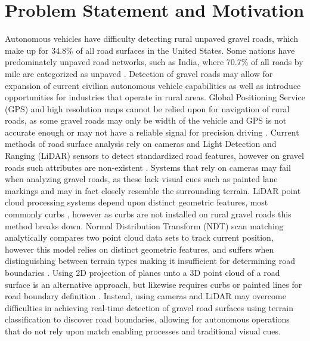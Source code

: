 \documentclass[numbered,pdftex]{ohio-etd}
\begin{document}
\section{Problem Statement and Motivation}
{
	
	{Autonomous vehicles have difficulty detecting rural unpaved gravel roads, which make up for 34.8\% \cite{road_stats_2} of all road surfaces in the United States. Some nations have predominately unpaved road networks, such as India, where 70.7\% of all roads by mile are categorized as unpaved \cite{malik_lal_2019}. Detection of gravel roads may allow for expansion of current civilian autonomous vehicle capabilities as well as introduce opportunities for industries that operate in rural areas. Global Positioning Service (GPS) and high resolution maps cannot be relied upon for navigation of rural roads, as some gravel roads may only be width of the vehicle and GPS is not accurate enough or may not have a reliable signal for precision driving \cite{noauthor_gpsgov_nodate}. Current methods of road surface analysis rely on cameras and Light Detection and Ranging (LiDAR) sensors to detect standardized road features, however on gravel roads such attributes are non-existent \cite{skorseth_gravel_nodate}. Systems that rely on cameras may fail when analyzing gravel roads, as these lack visual cues such as painted lane markings \cite{crisman_scarf_1993} and may in fact closely resemble the surrounding terrain. LiDAR point cloud processing systems depend upon distinct geometric features, most commonly curbs \cite{yadav_extraction_2017,liu_new_2013,qiu_fast_2016,fernandes_road_2014,seker_experiments_nodate,yang_semi-automated_2013,miyazaki_line-based_2014,hervieu_road_2013,smadja_road_nodate}, however as curbs are not installed on rural gravel roads \cite{skorseth_gravel_nodate} this method breaks down. Normal Distribution Transform (NDT) scan matching analytically compares two point cloud data sets to track current position, however this model relies on distinct geometric features, and suffers when distinguishing between terrain types making it insufficient for determining road boundaries \cite{biber_normal_2003}. Using 2D projection of planes unto a 3D point cloud of a road surface is an alternative approach, but likewise requires curbs or painted lines for road boundary definition \cite{fernandes_road_2014, borkar_robust_2009-1, guo_lane_2015}. Instead, using cameras and LiDAR may overcome difficulties in achieving real-time detection of gravel road surfaces using terrain classification to discover road boundaries, allowing for autonomous operations that do not rely upon match enabling processes and traditional visual cues. }
	
}
\end{document}
